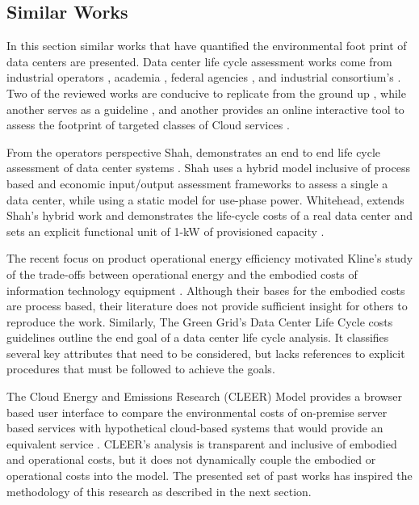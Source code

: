     \subsection{Similar Works}
        In this section similar works that have quantified the environmental foot print of data centers are presented. Data center life cycle assessment works come from industrial operators \cite{shah11},  academia \cite{whitehead15,kline16}, federal agencies \cite{CLEER13}, and industrial consortium's \cite{tgg12}. Two of the reviewed works are conducive to replicate from the ground up \cite{shah11,whitehead15}, while another serves as a guideline \cite{tgg12}, and another provides an online interactive tool to assess the footprint of targeted classes of Cloud services \cite{CLEER13}. 

        From the operators perspective Shah, demonstrates an end to end life cycle assessment of data center systems \cite{shah11}. Shah uses a hybrid model inclusive of process based and economic input/output assessment frameworks to assess a single a data center, while using a static model for use-phase power. Whitehead, extends Shah's hybrid work and demonstrates the life-cycle costs of a real data center and sets an explicit functional unit of 1-kW of provisioned capacity \cite{whitehead15}.  
        
        The recent focus on product operational energy efficiency motivated Kline’s study of the trade-offs between operational energy and the embodied costs of information technology equipment \cite{kline16}. Although their bases for the embodied costs are process based, their literature does not provide sufficient insight for others to reproduce the work. Similarly, The Green Grid's Data Center Life Cycle costs guidelines outline the end goal of a data center life cycle analysis. It classifies several key attributes that need to be considered, but lacks references to explicit procedures that must be followed to achieve the goals. 
        
       The Cloud Energy and Emissions Research (CLEER) Model provides a browser based user interface to compare the environmental costs of on-premise server based services with hypothetical cloud-based systems that would provide an equivalent service \cite{CLEER13}. CLEER's analysis is transparent and inclusive of embodied and operational costs, but it does not dynamically couple the embodied or operational costs into the model. The presented set of past works has inspired the methodology of this research as described in the next section.

